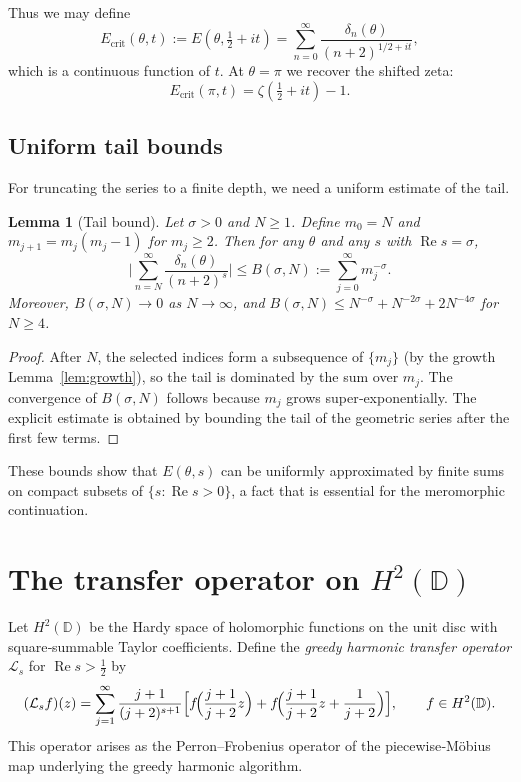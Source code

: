\documentclass[12pt,a4paper]{article}
\newtheorem{lemma}[theorem]{Lemma}
\theoremstyle{remark}
\begin{document}
Thus we may define
\[
E_{\mathrm{crit}}(\theta,t) := E(\theta,\tfrac12+it) = \sum_{n=0}^\infty \frac{\delta_n(\theta)}{(n+2)^{1/2+it}},
\]
which is a continuous function of $t$.  At $\theta=\pi$ we recover the shifted zeta:
\[
E_{\mathrm{crit}}(\pi,t) = \zeta(\tfrac12+it)-1.
\]

\subsection{Uniform tail bounds}
\label{sec:tailbounds}

For truncating the series to a finite depth, we need a uniform estimate of the tail.

\begin{lemma}[Tail bound]\label{lem:tail}
Let $\sigma>0$ and $N\ge1$.  Define $m_0=N$ and $m_{j+1}=m_j(m_j-1)$ for $m_j\ge2$.
Then for any $\theta$ and any $s$ with $\operatorname{Re}s=\sigma$,
\[
\biggl| \sum_{n=N}^\infty \frac{\delta_n(\theta)}{(n+2)^s} \biggr|
\le B(\sigma,N) := \sum_{j=0}^\infty m_j^{-\sigma}.
\]
Moreover, $B(\sigma,N)\to0$ as $N\to\infty$, and $B(\sigma,N)\le N^{-\sigma}+N^{-2\sigma}+2N^{-4\sigma}$ for $N\ge4$.
\end{lemma}
\begin{proof}
After $N$, the selected indices form a subsequence of $\{m_j\}$ (by the growth Lemma~\ref{lem:growth}),
so the tail is dominated by the sum over $m_j$.
The convergence of $B(\sigma,N)$ follows because $m_j$ grows super‑exponentially.
The explicit estimate is obtained by bounding the tail of the geometric series after the first few terms.
\end{proof}

These bounds show that $E(\theta,s)$ can be uniformly approximated by finite sums on compact subsets of $\{s:\operatorname{Re}s>0\}$, a fact that is essential for the meromorphic continuation.

\section{The transfer operator on \(H^2(\mathbb{D})\)}
\label{sec:transfer}

Let $H^2(\mathbb{D})$ be the Hardy space of holomorphic functions on the unit disc with square‑summable Taylor coefficients.
Define the \emph{greedy harmonic transfer operator} $\mathcal{L}_s$ for $\operatorname{Re}s>\frac12$ by
\begin{equation}\label{eq:Ldef}
(\mathcal{L}_s f)(z) = \sum_{j=1}^\infty \frac{j+1}{(j+2)^{s+1}}
\Bigl[ f\!\Bigl(\frac{j+1}{j+2}z\Bigr)
+ f\!\Bigl(\frac{j+1}{j+2}z + \frac{1}{j+2}\Bigr) \Bigr],
\qquad f\in H^2(\mathbb{D}).
\end{equation}
This operator arises as the Perron–Frobenius operator of the piecewise‑Möbius map underlying the greedy harmonic algorithm.
\end{document}
